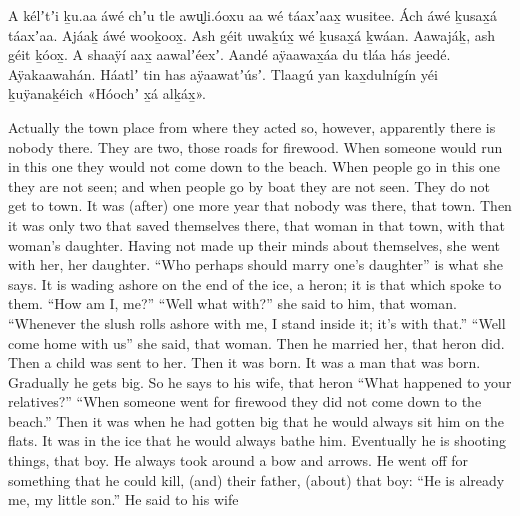 \begin{pairs}
\begin{Leftside}
A kélʼtʼi ḵu.aa áwé chʼu tle awu̬li\-.óoxu aa wé táaxʼaax̱ wusitee.
Ách áwé ḵusax̱á táaxʼaa.
Ajáaḵ áwé wooḵoox̱.
Ash géit uwaḵúx̱ wé ḵusax̱á ḵwáan.
Aawajáḵ, ash géit ḵóox̱.
A shaaÿí aax̱ aawalʼéexʼ.
Aandé aÿaawax̱áa du tláa hás jeedé.
Aÿa\-kaawahán.
Háatlʼ tin has aÿaawatʼúsʼ.
\pend
\pstart
{}Tlaagú yan kax̱dulnígín yéi ḵuÿanaḵéich
«\!Hóochʼ x̱á alḵáx̱\!».
\pend
\endnumbering
\end{Leftside}
\begin{Rightside}
\beginnumbering
\setcounter{pstartR}{12}
\pstart
\noindent
{}Actually the town place from where they acted so, however, apparently there is nobody there.
They are two, those roads for firewood.
Wh\-en someone would run in this one they would not come down to the beach.
When people go in this one they are not seen;
and when people go by boat they are not seen.
They do not get to town.
It was (after) one more year that nobody was there, that town.
Then it was only two that saved themselves there, that woman in that town, with that woman’s daughter.
Having not made up their minds about themselves, she went with her, her daughter.
\qqk{}“Who perhaps should marry one’s daughter” is what she says.
It is wading ashore on the end of the ice, a heron;
it is that which spoke to them.
\qqk{}“How am I, me?”
\qqk{}“Well what with?” she said to him, that woman.
\qqk{}“Whenever the slush rolls ashore with me, I stand inside it;
it’s with that.”
“Well come home with us”
she said, that woman.
Then he married her, that heron did.
Then a child was sent to her.
Then it was born.
It was a man that was born.
Gradually he gets big.
So he says to his wife, that heron
\qqk{}“What happened to your relatives?”
\qqk{}“When someone went for firewood they did not come down to the beach.”
\pend
\pstart
{}Then it was when he had gotten big that he would always sit him on the flats.
It was in the ice that he would always bathe him.
Eventually he is shooting things, that boy.
He always took around a bow and arrows.
He went off for something that he could kill, (and) their father, (about) that boy:
\qqk{}“He is already me, my little son.”
He said to his wife

\end{Rightside}
\end{pairs}
